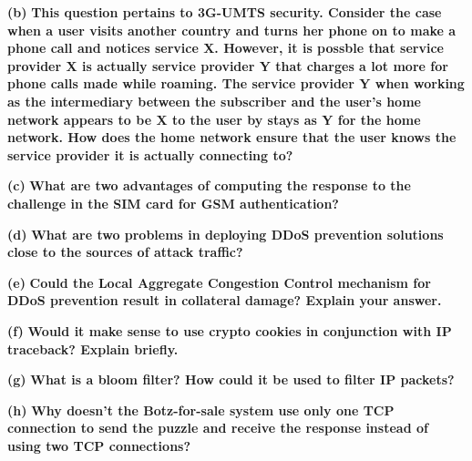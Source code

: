 \documentclass[11pt]{article}
\renewcommand\part[1]{\vspace{.10in}\textbf{(#1)}}
\begin{document}
\part{b} \textbf{This question pertains to 3G-UMTS security. Consider the case when a user visits another country and turns her phone on to make a phone call and notices service X. However, it is possble that service provider X is actually service provider Y that charges a lot more for phone calls made while roaming. The service provider Y when working as the intermediary between the subscriber and the user's home network appears to be X to the user by stays as Y for the home network. How does the home network ensure that the user knows the service provider it is actually connecting to?}

\part{c} \textbf{What are two advantages of computing the response to the challenge in the SIM card for GSM authentication?}

\part{d} \textbf{What are two problems in deploying DDoS prevention solutions close to the sources of attack traffic?}

\part{e} \textbf{Could the Local Aggregate Congestion Control mechanism for DDoS prevention result in collateral damage? Explain your answer.}

\part{f} \textbf{Would it make sense to use crypto cookies in conjunction with IP traceback? Explain briefly.}

\part{g} \textbf{What is a bloom filter? How could it be used to filter IP packets?}

\part{h} \textbf{Why doesn't the Botz-for-sale system use only one TCP connection to send the puzzle and receive the response instead of using two TCP connections?}
\end{document}
